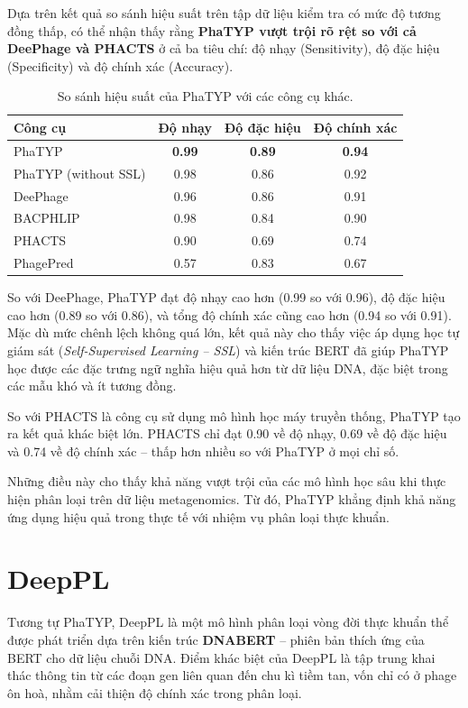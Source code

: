 Dựa trên kết quả so sánh hiệu suất trên tập dữ liệu kiểm tra có mức độ tương đồng thấp, có thể nhận thấy rằng \textbf{PhaTYP vượt trội rõ rệt so với cả DeePhage và PHACTS} ở cả ba tiêu chí: độ nhạy (Sensitivity), độ đặc hiệu (Specificity) và độ chính xác (Accuracy).

\begin{table}[ht]
\centering
\caption{So sánh hiệu suất của PhaTYP với các công cụ khác.}
\label{tab:PhaTPY_Result}
\begin{tabular}{|l|c|c|c|}
\hline
\textbf{Công cụ} & \textbf{Độ nhạy} & \textbf{Độ đặc hiệu} & \textbf{Độ chính xác} \\
\hline
PhaTYP             & \textbf{0.99} & \textbf{0.89} & \textbf{0.94} \\
PhaTYP (without SSL)   & 0.98 & 0.86 & 0.92 \\
DeePhage           & 0.96 & 0.86 & 0.91 \\
BACPHLIP           & 0.98 & 0.84 & 0.90 \\
PHACTS             & 0.90 & 0.69 & 0.74 \\
PhagePred          & 0.57 & 0.83 & 0.67 \\
\hline
\end{tabular}
\end{table}

So với DeePhage, PhaTYP đạt độ nhạy cao hơn (0.99 so với 0.96), độ đặc hiệu cao hơn (0.89 so với 0.86), và tổng độ chính xác cũng cao hơn (0.94 so với 0.91). Mặc dù mức chênh lệch không quá lớn, kết quả này cho thấy việc áp dụng học tự giám sát (\textit{Self-Supervised Learning – SSL}) và kiến trúc BERT đã giúp PhaTYP học được các đặc trưng ngữ nghĩa hiệu quả hơn từ dữ liệu DNA, đặc biệt trong các mẫu khó và ít tương đồng.

So với PHACTS là công cụ sử dụng mô hình học máy truyền thống, PhaTYP tạo ra kết quả khác biệt lớn. PHACTS chỉ đạt 0.90 về độ nhạy, 0.69 về độ đặc hiệu và 0.74 về độ chính xác – thấp hơn nhiều so với PhaTYP ở mọi chỉ số. 

Những điều này cho thấy khả năng vượt trội của các mô hình học sâu khi thực hiện phân loại trên dữ liệu metagenomics. Từ đó, PhaTYP khẳng định khả năng ứng dụng hiệu quả trong thực tế với nhiệm vụ phân loại thực khuẩn.

\section{DeepPL}
Tương tự PhaTYP, DeepPL\cite{zhang2024deeppl} là một mô hình phân loại vòng đời thực khuẩn thể được phát triển dựa trên kiến trúc \textbf{DNABERT} – phiên bản thích ứng của BERT cho dữ liệu chuỗi DNA. Điểm khác biệt của DeepPL là tập trung khai thác thông tin từ các đoạn gen liên quan đến chu kì tiềm tan, vốn chỉ có ở phage ôn hoà, nhằm cải thiện độ chính xác trong phân loại.

